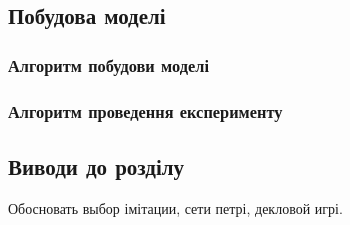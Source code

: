 \subsection{Побудова моделі}
\subsubsection{Алгоритм побудови моделі}
 



\subsubsection{Алгоритм проведення експерименту}
\subsection{Виводи до розділу}
Обосновать выбор імітации, сети петрі, декловой игрі.


 
